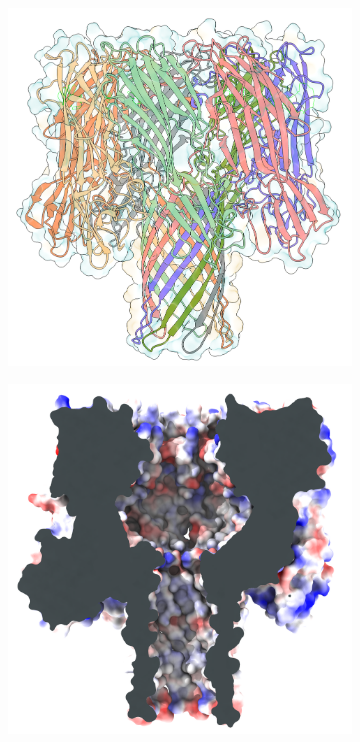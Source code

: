 \begin{figure}[ht]
  \begin{centering}
  \begin{subfigure}[t]{\dimexpr.4\linewidth-1.3em\relax}
  \centering
  \includegraphics[width=\linewidth,valign=t]{Figures/ahl-front-c.png}
  \end{subfigure}%
  \begin{subfigure}[t]{\dimexpr.4\linewidth-1.3em\relax}
  \centering
  \includegraphics[width=\linewidth,valign=t]{Figures/ahl-elec.png}
  \end{subfigure}%


\end{centering}
\end{figure}
